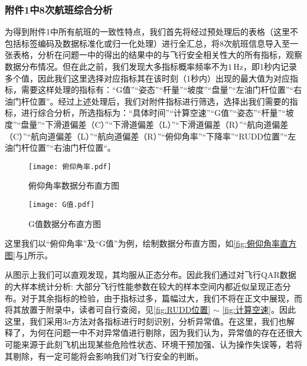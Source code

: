\documentclass{MathorCupModeling}
\begin{document}
	\subsubsection{附件1中8次航班综合分析}
	为得到附件1中所有航班的一致性特点，我们首先将经过预处理后的表格（这里不包括标签编码及数据标准化或归一化处理）进行全汇总，将8次航班信息导入至一张表格，分析在问题一中的得出的结果中的与飞行安全相关性大的所有指标，观察数据分布情况。但在此之前，我们发现大多指标概率频率不为$1\,\text{Hz}$，即1秒内记录多个值，因此我们这里选择对应指标其在该时刻（1秒内）出现的最大值为对应指标，需要这样处理的指标有：“G值”“姿态”“杆量”“坡度”“盘量”“左油门杆位置”“右油门杆位置”。经过上述处理后，我们对附件指标进行筛选，选择出我们需要的指标，进行综合分析，所选指标为：“具体时间”“计算空速”“G值”“姿态”“杆量”“坡度”“盘量”“下滑道偏差（C）”“下滑道偏差（L）”“下滑道偏差（R）”“航向道偏差（C）”“航向道偏差（L）”“航向道偏差（R）”“俯仰角率”“下降率”“RUDD位置”“左油门杆位置”“右油门杆位置“。
	\begin{figure}[H]
		\centering
		\begin{minipage}{0.48\linewidth}
			\centering
			\texttt{[image: 俯仰角率.pdf]}
			\caption{俯仰角率数据分布直方图}
			\label{fig:俯仰角率直方图}
		\end{minipage}
		\begin{minipage}{0.48\linewidth}
			\centering
			\texttt{[image: G值.pdf]}
			\caption{G值数据分布直方图}
			\label{fig:G值直方图}
		\end{minipage}
	\end{figure}

	这里我们以“俯仰角率”及“G值”为例，绘制数据分布直方图，如\textcolor{blue}{\cref{fig:俯仰角率直方图}}与\textcolor{blue}{\cref{fig:G值直方图}}所示。


	从图示上我们可以直观发现，其均服从正态分布。因此我们通过对飞行QAR数据的大样本统计分析: 大部分飞行性能参数在较大的样本空间内都近似呈现正态分布\textcolor{blue}{\cite{Paper:正态分布}}。对于其余指标的检验，由于指标过多，篇幅过大，我们不将在正文中展现，而将其放置于附录中，读者可自行查阅，见\textcolor{blue}{\cref{fig:RUDD位置}} $\sim$ \textcolor{blue}{\cref{fig:计算空速}}。因此这里，我们采用$3\sigma$方法对各指标进行时刻识别，分析异常值。在这里，我们也解释了，为何在问题一中不对异常值进行剔除，因为我们认为，异常值的存在还很大可能来源于此刻飞机出现某些危险性状态、环境干预加强、认为操作失误等，若将其剔除，有一定可能将会影响我们对飞行安全的判断。
\end{document}
